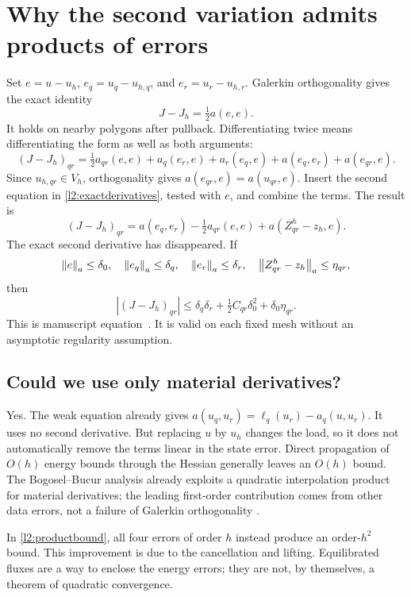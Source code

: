 \section{Why the second variation admits products of errors}
\label{l2:identity}
Set $e=u-u_h$, $e_q=u_q-u_{h,q}$, and $e_r=u_r-u_{h,r}$.
Galerkin orthogonality gives the exact identity
\begin{equation}
 J-J_h=\tfrac12a(e,e).
 \label{l2:energyidentity}
\end{equation}
It holds on nearby polygons after pullback. Differentiating twice means
differentiating the form as well as both arguments:
\[
 (J-J_h)_{qr}=\tfrac12a_{qr}(e,e)+a_q(e_r,e)+a_r(e_q,e)
                      +a(e_q,e_r)+a(e_{qr},e).
\]
Since $u_{h,qr}\in V_h$, orthogonality gives
$a(e_{qr},e)=a(u_{qr},e)$. Insert the second equation in
\eqref{l2:exactderivatives}, tested with $e$, and combine the terms.
The result is
\begin{equation}
 (J-J_h)_{qr}=a(e_q,e_r)-\tfrac12a_{qr}(e,e)
                         +a(Z_{qr}^h-z_h,e).
 \label{l2:productidentity}
\end{equation}
The exact second derivative has disappeared. If
\[
 \left\|e\right\|_a\leq\delta_0,\quad \left\|e_q\right\|_a\leq\delta_q,
 \quad\left\|e_r\right\|_a\leq\delta_r,\quad
 \left\|Z_{qr}^h-z_h\right\|_a\leq\eta_{qr},
\]
then
\begin{equation}
 |(J-J_h)_{qr}|\leq
 \delta_q\delta_r+\tfrac12C_{qr}\delta_0^2+\delta_0\eta_{qr}.
 \label{l2:productbound}
\end{equation}
This is manuscript equation~.
It is valid on each fixed mesh without an asymptotic regularity assumption.

\subsection{Could we use only material derivatives?}
Yes. The weak equation already gives
$a(u_q,u_r)=\ell_q(u_r)-a_q(u,u_r)$. It uses no second derivative.
But replacing $u$ by $u_h$ changes the load, so it does not automatically
remove the terms linear in the state error. Direct propagation of
$O(h)$ energy bounds through the Hessian generally leaves an $O(h)$ bound.
The Bogosel--Bucur analysis already exploits a quadratic interpolation
product for material derivatives; the leading first-order contribution
comes from other data errors, not a failure of Galerkin orthogonality
\cite[Section 3.1]{BogoselBucurValidated2024}.

In \eqref{l2:productbound}, all four errors of order $h$ instead produce
an order-$h^2$ bound. This improvement is due to the cancellation and
lifting. Equilibrated fluxes are a way to enclose the energy errors;
they are not, by themselves, a theorem of quadratic convergence.

